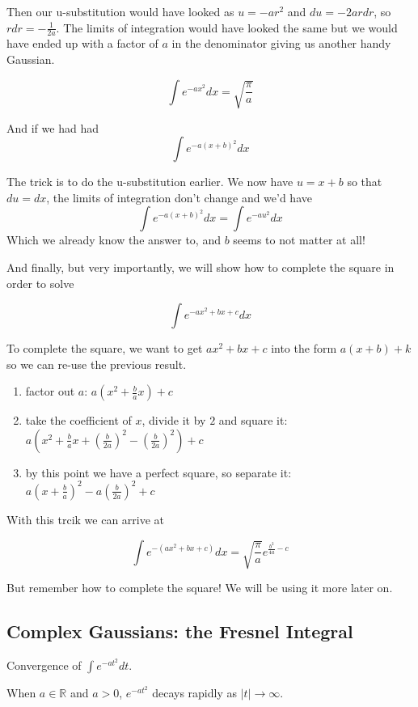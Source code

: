 Then our u-substitution would have looked as $u = -ar^2$
and $du = -2ar dr$, so $r dr = -\frac{1}{2a}$.
The limits of integration would have looked the same but we would have ended up with a factor of $a$
in the denominator giving us another handy Gaussian.

$$
\int e^{-ax^2} dx = \sqrt{ \frac{\pi}{a} }
$$

And if we had had
$$
\int e^{-a\left(x + b\right)^2} dx
$$

The trick is to do the u-substitution earlier.
We now have $u = x+b$ so that $du = dx$, the limits of integration don't change and we'd have
$$
\int e^{-a\left(x + b\right)^2} dx
=
\int e^{-a u^2} dx
$$
Which we already know the answer to, and $b$ seems to not matter at all!

And finally, but very importantly, we will show how to complete the square in order to solve

$$
\int e^{-ax^2 + bx + c} dx
$$

To complete the square, we want to get $ax^2 + bx + c$ into the form $a(x+b) + k$ so we can
re-use the previous result.
\begin{enumerate}
\item factor out $a$: $a \left(x^2 + \frac{b}{a}x \right) + c$
\item take the coefficient of $x$, divide it by $2$ and square it: $a \left(x^2 + \frac{b}{a}x + \left(\frac{b}{2a}\right)^2 - \left(\frac{b}{2a}\right)^2 \right) + c$
\item by this point we have a perfect square, so separate it: $a \left(x + \frac{b}{a} \right)^2 - a\left(\frac{b}{2a}\right)^2 + c$
\end{enumerate}

With this trcik we can arrive at

$$
\int e^{-\left(ax^2 + bx + c\right)} dx = \sqrt{\frac{\pi}{a}} e^{\frac{b^2}{4a} - c}
$$

But remember how to complete the square!
We will be using it more later on.


\subsection{Complex Gaussians: the Fresnel Integral} \label{integrals:complex-gaussian}


Convergence of $\int e^{-at^2} dt$.

When $a \in \mathbb{R}$ and $a>0$, $e^{-at^2}$ decays rapidly as $|t| \rightarrow \infty$.

